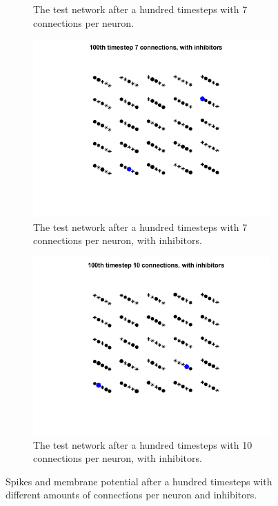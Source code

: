 \begin{figure}
\begin{subfigure}[b]{0.4\textwidth}
        \caption{The test network after a hundred timesteps with 7 connections per neuron.}
    \label{fig:reservoir_7}
    \end{subfigure}
    \begin{subfigure}[b]{0.4\textwidth}
        \includegraphics[width=\textwidth]{Images/pool_7_100_s.png}
        \caption{The test network after a hundred timesteps with 7 connections per neuron, with inhibitors.}
    \label{fig:reservoir_7_in}
    \end{subfigure}
     \begin{subfigure}[b]{0.4\textwidth}
        \includegraphics[width=\textwidth]{Images/pool_10_100_s.png}
        \caption{The test network after a hundred timesteps with 10 connections per neuron, with inhibitors.}
    \label{fig:reservoir_10_in}
    \end{subfigure}
    \caption{Spikes and membrane potential after a hundred timesteps with different amounts of connections per neuron and inhibitors.}
\end{figure}


